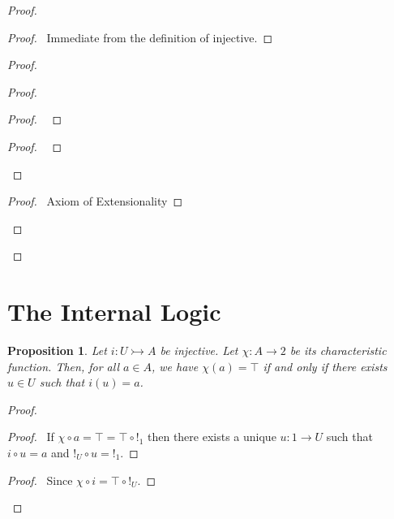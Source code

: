 \documentclass{book}
\let\qed\relax
\newtheorem{prop}[ax]{Proposition}
\theoremstyle{definition}
\begin{document}
\begin{proof}
\pf
{}
\begin{proof}
	\pf\ Immediate from the definition of injective.
\end{proof}
\begin{proof}
	\begin{proof}
		\begin{proof}
			\pf\ 
		\end{proof}
		\begin{proof}
			\pf\ 
		\end{proof}
	\end{proof}
	\begin{proof}
		\pf\ Axiom of Extensionality
	\end{proof}
\end{proof}
\qed
\end{proof}

\section{The Internal Logic}

\begin{prop}
\label{prop:charfun}
Let $i : U \rightarrowtail A$ be injective. Let $\chi : A \rightarrow 2$ be its characteristic function. Then, for all $a \in A$, we have $\chi(a) = \top$ if and only if there exists $u \in U$ such that $i(u) = a$.
\end{prop}

\begin{proof}
\pf
{}
\begin{proof}
	\pf\ If $\chi \circ a = \top = \top \circ !_1$ then there exists a unique $u : 1 \rightarrow U$ such that $i \circ u = a$ and $!_U \circ u = !_1$.
\end{proof}
\begin{proof}
	\pf\ Since $\chi \circ i = \top \circ !_U$.
\end{proof}
\qed
\end{proof}
\end{document}
